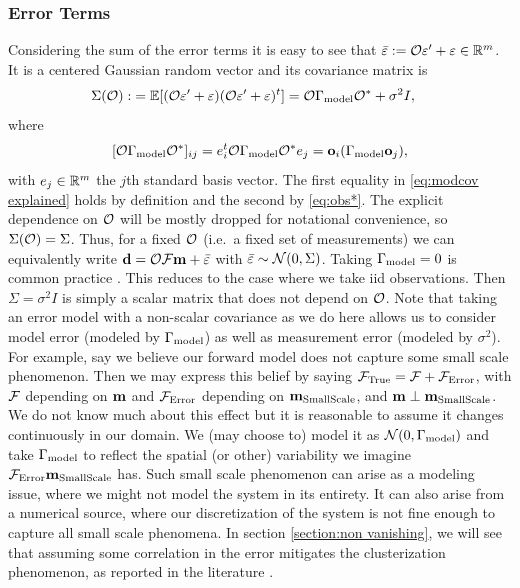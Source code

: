 \documentclass{amsart}
\numberwithin{equation}{section}
\begin{document}
\subsubsection{Error Terms}
Considering the sum of the error terms it is easy to see that
$\bar{\varepsilon} := \mathcal{O} \varepsilon' + \varepsilon \in \mathbb{R}^m$. It is a centered Gaussian
random vector and its covariance matrix is
\begin{align}\label{eq:Sigma}
  \begin{split}
    \Sigma(\mathcal{O}) :&= \mathbb{E}[ (\mathcal{O} \varepsilon' + \varepsilon)  (\mathcal{O} \varepsilon' + \varepsilon)^t ] 
    = \mathcal{O} \Gamma_{\textup{model}} \mathcal{O}^* + \sigma^2I , 
  \end{split}
\end{align}
where
\begin{equation}\label{eq:modcov explained}
  [\mathcal{O} \Gamma_{\textup{model}} \mathcal{O}^*]_{ij} = e_i^t \mathcal{O} \Gamma_{\textup{model}} \mathcal{O}^* e_j = \mathbf{o}_i (\Gamma_{\textup{model}} \mathbf{o}_j),
\end{equation}
with $e_j \in \mathbb{R}^m$ the $j$th standard basis vector. The first
equality in \eqref{eq:modcov explained} holds by definition and the
second by \eqref{eq:obs*}. The explicit dependence on $\mathcal{O}$ will be
mostly dropped for notational convenience, so $\Sigma(\mathcal{O}) =
\Sigma$. Thus, for a fixed $\mathcal{O}$ (i.e.\ a fixed set of measurements)
we can equivalently write $\mathbf{d} = \mathcal{O} \mathcal{F} \mathbf{m} + \bar{\varepsilon}$ with
$\bar{\varepsilon} \sim \mathcal{N}(0,\Sigma)$. Taking $\Gamma_{\textup{model}} = 0$ is common
practice \cite{Tarantola05,KaipioSomersalo05,Vogel02}. This reduces to
the case where we take iid observations. Then $\Sigma = \sigma^2I$ is
simply a scalar matrix that does not depend on $\mathcal{O}$. Note that
taking an error model with a non-scalar covariance as we do here
allows us to consider model error (modeled by $\Gamma_{\textup{model}}$) as well as
measurement error (modeled by $\sigma^2$). For example, say we believe
our forward model does not capture some small scale phenomenon.  Then
we may express this belief by saying $\mathcal{F}_{\textup{True}} = \mathcal{F} + \mathcal{F}_{\textup{Error}}$, with $\mathcal{F}$
depending on $\mathbf{m}$ and $\mathcal{F}_{\textup{Error}}$ depending on $\mathbf{m}_{\textup{SmallScale}}$, and $\mathbf{m}
\perp \mathbf{m}_{\textup{SmallScale}}$. We do not know much about this effect but it is
reasonable to assume it changes continuously in our domain. We (may
choose to) model it as $\mathcal{N} (0, \Gamma_{\textup{model}})$ and take $\Gamma_{\textup{model}}$ to
reflect the spatial (or other) variability we imagine $\mathcal{F}_{\textup{Error}} \mathbf{m}_{\textup{SmallScale}}$
has. Such small scale phenomenon can arise as a modeling issue, where
we might not model the system in its entirety. It can also arise from
a numerical source, where our discretization of the system is not fine
enough to capture all small scale phenomena. In section
\ref{section:non vanishing}, we will see that assuming some
correlation in the error mitigates the clusterization phenomenon, as
reported in the literature \cite{Ucinski05}.
\end{document}
